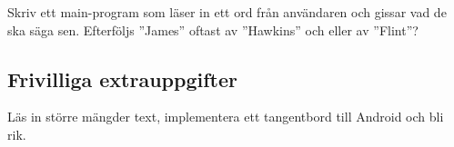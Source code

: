 \Subtask Skriv ett main-program som läser in ett ord från användaren och gissar vad de ska säga sen. Efterföljs ''James'' oftast av ''Hawkins'' och eller av ''Flint''?




\subsection{Frivilliga extrauppgifter}

\Task Läs in större mängder text, implementera ett tangentbord till Android och bli rik.


    